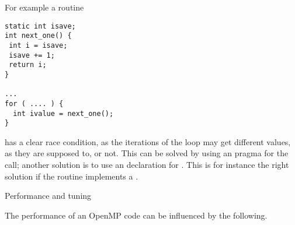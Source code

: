 For example a routine
\begin{verbatim}
static int isave;
int next_one() {
 int i = isave;
 isave += 1;
 return i;
}

...
for ( .... ) {
  int ivalue = next_one();
}
\end{verbatim}
has a clear race condition, as the iterations of the loop
may get different  values, as they are supposed to,
or not. This can be solved by using an 
pragma for the  call; another solution 
is to use an  declaration for .
This is for instance the right solution if  the 
routine implements a .


 {Performance and tuning}


The performance of an OpenMP code can be influenced by the following.

